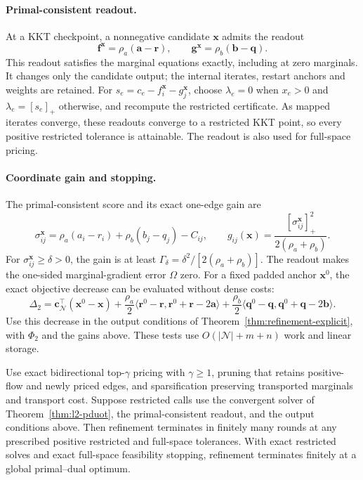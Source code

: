 \paragraph{Primal-consistent readout.}
At a KKT checkpoint, a nonnegative candidate $\mathbf x$ admits the readout
\begin{equation*}
\mathbf f^{\mathbf x}=\rho_a(\mathbf a-\mathbf r),\qquad
\mathbf g^{\mathbf x}=\rho_b(\mathbf b-\mathbf q).
\end{equation*}
This readout satisfies the marginal equations exactly, including at zero marginals.
It changes only the candidate output; the internal iterates, restart anchors and weights are retained.
For $s_e=c_e-f_i^{\mathbf x}-g_j^{\mathbf x}$, choose $\lambda_e=0$ when $x_e>0$ and $\lambda_e=[s_e]_+$ otherwise, and recompute the restricted certificate.
As mapped iterates converge, these readouts converge to a restricted KKT point, so every positive restricted tolerance is attainable.
The readout is also used for full-space pricing.

\paragraph{Coordinate gain and stopping.}
The primal-consistent score and its exact one-edge gain are
\begin{equation*}
\sigma_{ij}^{\mathbf x}=\rho_a(a_i-r_i)+\rho_b(b_j-q_j)-C_{ij},\qquad
g_{ij}(\mathbf x)=\frac{[\sigma_{ij}^{\mathbf x}]_+^2}{2(\rho_a+\rho_b)}.
\end{equation*}
For $\sigma_{ij}^{\mathbf x}\geq\delta>0$, the gain is at least $\Gamma_\delta=\delta^2/[2(\rho_a+\rho_b)]$.
The readout makes the one-sided marginal-gradient error $\Omega$ zero.
For a fixed padded anchor $\mathbf x^0$, the exact objective decrease can be evaluated without dense costs:
\begin{equation*}
\Delta_2=\mathbf c_{\mathcal N}^{\top}(\mathbf x^0-\mathbf x)
+\frac{\rho_a}{2}\langle\mathbf r^0-\mathbf r,\mathbf r^0+\mathbf r-2\mathbf a\rangle
+\frac{\rho_b}{2}\langle\mathbf q^0-\mathbf q,\mathbf q^0+\mathbf q-2\mathbf b\rangle.
\end{equation*}
Use this decrease in the output conditions of Theorem~\ref{thm:refinement-explicit}, with $\Phi_2$ and the gains above.
These tests use $O(|\mathcal N|+m+n)$ work and linear storage.

\begin{theorem}
\label{thm:l2-refinement}
Use exact bidirectional top-$\gamma$ pricing with $\gamma\geq1$, pruning that retains positive-flow and newly priced edges, and sparsification preserving transported marginals and transport cost.
Suppose restricted calls use the convergent solver of Theorem~\ref{thm:l2-pduot}, the primal-consistent readout, and the output conditions above.
Then refinement terminates in finitely many rounds at any prescribed positive restricted and full-space tolerances.
With exact restricted solves and exact full-space feasibility stopping, refinement terminates finitely at a global primal--dual optimum.
\end{theorem}

